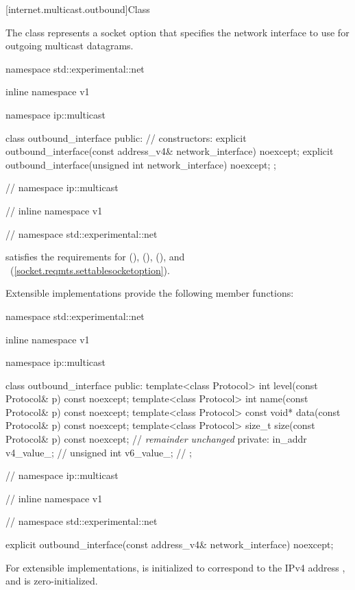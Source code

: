 %
[internet.multicast.outbound]{Class }

\pnum
The  class represents a socket option that specifies the network interface to use for outgoing multicast datagrams.

\begin{codeblock}
namespace std::experimental::net {
inline namespace v1 {
namespace ip::multicast {

  class outbound_interface
  {
  public:
    // constructors:
    explicit outbound_interface(const address_v4& network_interface) noexcept;
    explicit outbound_interface(unsigned int network_interface) noexcept;
  };

} // namespace ip::multicast
} // inline namespace v1
} // namespace std::experimental::net
\end{codeblock}

\pnum
{} satisfies the requirements for  (),  (),  (), and ~(\ref{socket.reqmts.settablesocketoption}).

%
\pnum
 Extensible implementations provide the following member functions:

\begin{codeblock}
namespace std::experimental::net {
inline namespace v1 {
namespace ip::multicast {

  class outbound_interface
  {
  public:
    template<class Protocol> int level(const Protocol& p) const noexcept;
    template<class Protocol> int name(const Protocol& p) const noexcept;
    template<class Protocol> const void* data(const Protocol& p) const noexcept;
    template<class Protocol> size_t size(const Protocol& p) const noexcept;
    // \textit{remainder unchanged}
  private:
      in_addr v4_value_; // \expos
      unsigned int v6_value_; // \expos
  };

} // namespace ip::multicast
} // inline namespace v1
} // namespace std::experimental::net
\end{codeblock}

\begin{itemdecl}
explicit outbound_interface(const address_v4& network_interface) noexcept;
\end{itemdecl}

\begin{itemdescr}
\pnum
\effects For extensible implementations,  is initialized to correspond to the IPv4 address , and  is zero-initialized.
\end{itemdescr}

